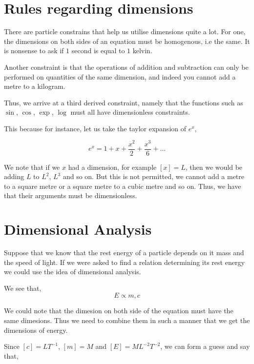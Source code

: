 \section{Rules regarding dimensions}

There are particle constrains that help us utilise dimensions quite a lot. For one,
the dimensions on both sides of an equation must be homogenous, i.e the same. It is nonsense
to ask if \(1\) second is equal to \(1\) kelvin. 

Another constraint is that the operations of addition and subtraction can only be 
performed on quantities of the same dimension, and indeed you cannot add a metre to a kilogram.

Thus, we arrive at a third derived constraint, namely that the functions such as \(\sin\), 
\(\cos\), \(\exp\), \(\log\) must all have dimensionless constraints. 

This because for instance, let us take the taylor expansion of \(e^x\),

\begin{equation*}
    e^x = 1 + x + \frac{x^2}{2} + \frac{x^3}{6} + \dots
\end{equation*}

We note that if we \(x\) had a dimension, for example \([x] = L\), then we would be adding 
\(L\) to \(L^2\), \(L^3\) and so on. But this is not permitted, we cannot add a metre to a square metre
or a square metre to a cubic metre and so on. Thus, we have that their arguments
must be dimensionless.

\section{Dimensional Analysis}

Suppose that we know that the rest energy of a particle depends on it mass and 
the speed of light. If we were asked to find a relation determining its rest energy
we could use the idea of dimensional analysis.

We see that, 
\begin{equation*}
    E \propto m, c
\end{equation*}

We could note that the dimesion on both side of the equation must have the same dimesions. Thus 
we need to combine them in such a manner that we get the dimensions of energy. 

Since \([c] = LT^{-1}\), \([m] = M\) and \([E] = ML^{-2}T^{-2}\), we can form a guess 
and say that,

